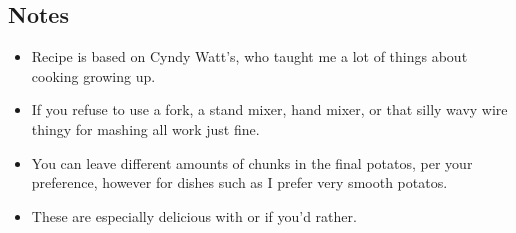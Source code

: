 \begin{multicols}{2}
\subsection*{Notes}
\begin{itemize}
    \item Recipe is based on Cyndy Watt's, who taught me a lot of things about cooking growing up.
    \item If you refuse to use a fork, a stand mixer, hand mixer, or that silly wavy wire thingy for mashing all work just fine.
    \item You can leave different amounts of chunks in the final potatos, per your preference, however for dishes such as  I prefer very smooth potatos.
    \item These are especially delicious with  or  if you'd rather.
\end{itemize}
\end{multicols}
\clearpage